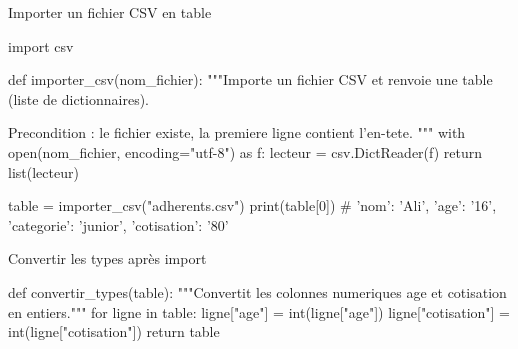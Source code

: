 \begin{codereference}{Importer un fichier CSV en table}
\begin{python}
import csv

def importer_csv(nom_fichier):
    """Importe un fichier CSV et renvoie une table (liste de dictionnaires).

    Precondition : le fichier existe, la premiere ligne contient l'en-tete.
    """
    with open(nom_fichier, encoding="utf-8") as f:
        lecteur = csv.DictReader(f)
        return list(lecteur)

table = importer_csv("adherents.csv")
print(table[0])  # {'nom': 'Ali', 'age': '16', 'categorie': 'junior', 'cotisation': '80'}
\end{python}
\end{codereference}



\begin{codereference}{Convertir les types après import}
\begin{python}
def convertir_types(table):
    """Convertit les colonnes numeriques age et cotisation en entiers."""
    for ligne in table:
        ligne["age"] = int(ligne["age"])
        ligne["cotisation"] = int(ligne["cotisation"])
    return table
\end{python}
\end{codereference}


